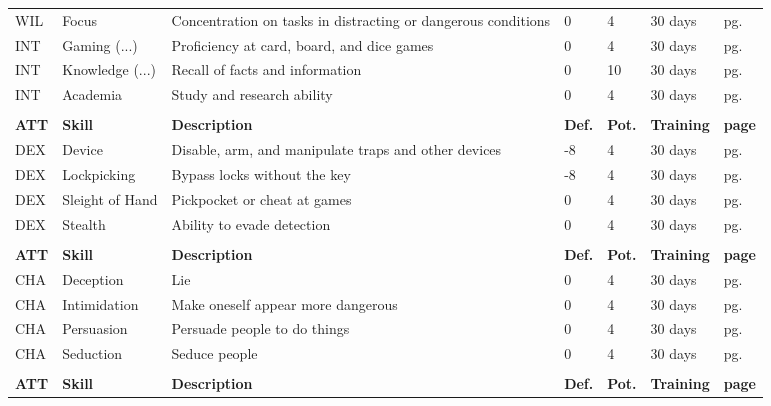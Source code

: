 \begin{center}
\begin{xltabular}{\textwidth}{l l X l l l l}
        WIL & Focus & Concentration on tasks in distracting or dangerous conditions & 0 & 4 & 30 days & pg. \pageref{skill:concentration} \\
        INT & Gaming (...) & Proficiency at card, board, and dice games & 0 & 4 & 30 days & pg. \pageref{skill:gaming} \\
        INT & Knowledge (...) & Recall of facts and information & 0 & 10 & 30 days & pg. \pageref{skill:knowledge} \\
        INT & Academia & Study and research ability & 0 & 4 & 30 days & pg. \pageref{skill:academia} \\
         \\*
        \textbf{ATT} & \textbf{Skill} & \textbf{Description} & \textbf{Def.} & \textbf{Pot.} & \textbf{Training} & \textbf{page} \\*
        DEX & Device & Disable, arm, and manipulate traps and other devices & -8 & 4 & 30 days & pg. \pageref{skill:device} \\
        DEX & Lockpicking & Bypass locks without the key & -8 & 4 & 30 days & pg. \pageref{skill:lockpicking} \\
        DEX & Sleight of Hand & Pickpocket or cheat at games & 0 & 4 & 30 days & pg. \pageref{skill:sleight-of-hand} \\
        DEX & Stealth & Ability to evade detection & 0 & 4 & 30 days & pg. \pageref{skill:stealth} \\
         \\*
        \textbf{ATT} & \textbf{Skill} & \textbf{Description} & \textbf{Def.} & \textbf{Pot.} & \textbf{Training} & \textbf{page} \\*
        CHA & Deception & Lie & 0 & 4 & 30 days & pg. \pageref{skill:deception} \\
        CHA & Intimidation & Make oneself appear more dangerous & 0 & 4 & 30 days & pg. \pageref{skill:intimidation} \\
        CHA & Persuasion & Persuade people to do things & 0 & 4 & 30 days & pg. \pageref{skill:persuasion} \\
        CHA & Seduction & Seduce people & 0 & 4 & 30 days& pg. \pageref{skill:seduction} \\
         \\*
        \textbf{ATT} & \textbf{Skill} & \textbf{Description} & \textbf{Def.} & \textbf{Pot.} & \textbf{Training} & \textbf{page} \\*

\end{xltabular}
\end{center}
